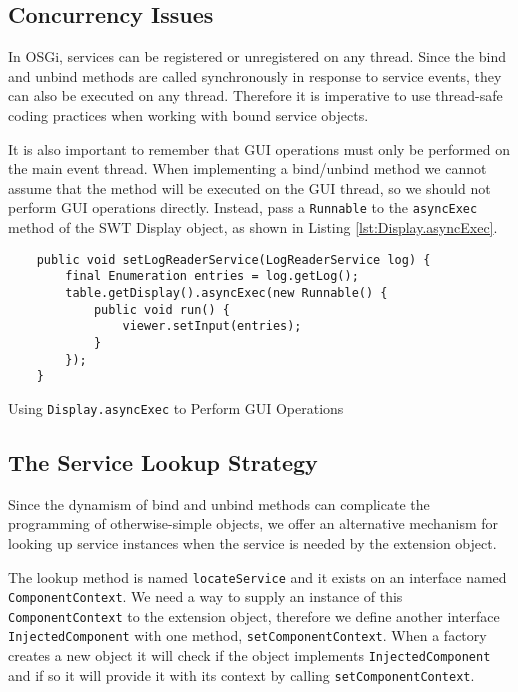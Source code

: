 \documentclass[12pt]{article}
\begin{document}
\subsection{Concurrency Issues}

In OSGi, services can be registered or unregistered on any thread. Since the bind and unbind methods are called synchronously in response to service events, they can also be executed on any thread. Therefore it is imperative to use thread-safe coding practices when working with bound service objects.

It is also important to remember that GUI operations must only be performed on the main event thread. When implementing a bind/unbind method we cannot assume that the method will be executed on the GUI thread, so we should not perform GUI operations directly. Instead, pass a \texttt{Runnable} to the \texttt{asyncExec} method of the SWT Display object, as shown in Listing \ref{lst:Display.asyncExec}.

\begin{program}
	\begin{lstlisting}
	public void setLogReaderService(LogReaderService log) {
		final Enumeration entries = log.getLog();
		table.getDisplay().asyncExec(new Runnable() {
			public void run() {
				viewer.setInput(entries);
			}
		});
	}
	\end{lstlisting}
	\caption{Using \texttt{Display.asyncExec} to Perform GUI Operations}
	\label{lst:Display.asyncExec}
\end{program}

\subsection{The Service Lookup Strategy}

Since the dynamism of bind and unbind methods can complicate the programming of otherwise-simple objects, we offer an alternative mechanism for looking up service instances when the service is needed by the extension object.

The lookup method is named \texttt{locateService} and it exists on an interface named \texttt{ComponentContext}. We need a way to supply an instance of this \texttt{Comp\-onent\-Con\-text} to the extension object, therefore we define another interface \texttt{Inj\-ected\-Comp\-onent} with one method, \texttt{setComponentContext}. When a factory creates a new object it will check if the object implements \texttt{InjectedComponent} and if so it will provide it with its context by calling \texttt{setComponentContext}.
\end{document}
